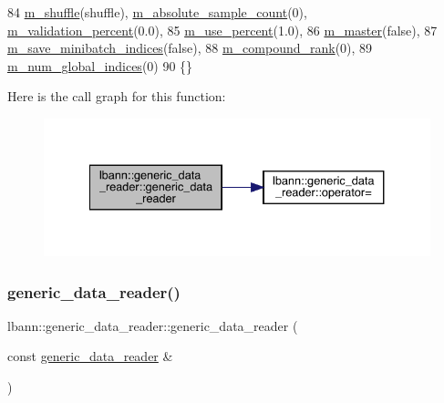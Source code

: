 \begin{DoxyCode}
84     \hyperlink{classlbann_1_1generic__data__reader_a8039ed9c12a5847f0dcf7dd54b8d2f5b}{m\_shuffle}(shuffle), \hyperlink{classlbann_1_1generic__data__reader_a462437ed899bc26ebec9ab2091980d0c}{m\_absolute\_sample\_count}(0), 
      \hyperlink{classlbann_1_1generic__data__reader_a3e4afbe28634a913f6de9daabf05dc0d}{m\_validation\_percent}(0.0),
85     \hyperlink{classlbann_1_1generic__data__reader_a8b475834bd80e7103c3631d2b061aabc}{m\_use\_percent}(1.0),
86     \hyperlink{classlbann_1_1generic__data__reader_a52610681839ba81c3050c0881ffc005b}{m\_master}(\textcolor{keyword}{false}),
87     \hyperlink{classlbann_1_1generic__data__reader_ab1d7cac44072bd1f67291c6169414112}{m\_save\_minibatch\_indices}(\textcolor{keyword}{false}),
88     \hyperlink{classlbann_1_1generic__data__reader_a7df02a1534b100df6f718dc7a7b32b25}{m\_compound\_rank}(0),
89     \hyperlink{classlbann_1_1generic__data__reader_ac6ea8dad1e9f0a8c939fd27d2de37e1b}{m\_num\_global\_indices}(0)
90   \{\}
\end{DoxyCode}
Here is the call graph for this function\+:\nopagebreak
\begin{figure}[H]
\begin{center}
\leavevmode
\includegraphics[width=334pt]{classlbann_1_1generic__data__reader_aaba933b8f7c1227801f6e80d39986af4_cgraph}
\end{center}
\end{figure}
\mbox{\label{classlbann_1_1generic__data__reader_a95d0ca539a613182898ff7693206fb40}} 
\subsubsection{\texorpdfstring{generic\+\_\+data\+\_\+reader()}{generic\_data\_reader()}\hspace{0.1cm}{\footnotesize\ttfamily [2/2]}}
{\footnotesize\ttfamily lbann\+::generic\+\_\+data\+\_\+reader\+::generic\+\_\+data\+\_\+reader (\begin{DoxyParamCaption}\item[{const \hyperlink{classlbann_1_1generic__data__reader}{generic\+\_\+data\+\_\+reader} \&}]{ }\end{DoxyParamCaption})\hspace{0.3cm}{\ttfamily [default]}}

